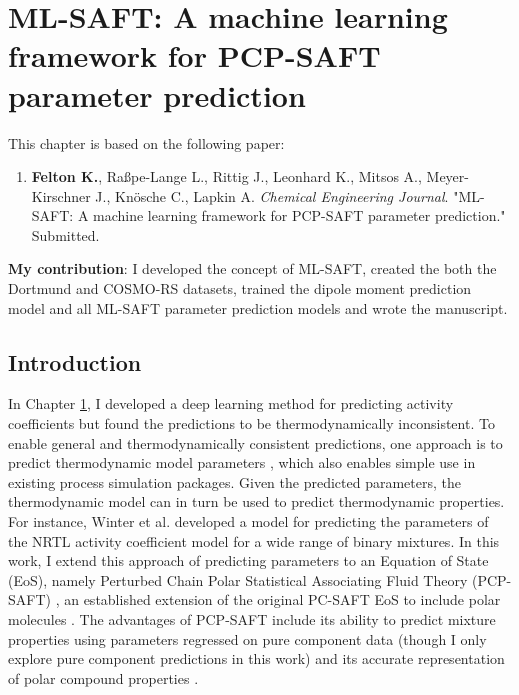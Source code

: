\chapter{ML-SAFT: A machine learning framework for PCP-SAFT parameter prediction}\label{ch:deep_gamma} 
This chapter is based on the following paper:
\begin{enumerate}
\item \textbf{Felton K.}, Ra{\ss}pe-Lange L., Rittig J., Leonhard K., Mitsos A., Meyer-Kirschner J., Kn\"osche C., Lapkin A. \textit{Chemical Engineering Journal}. "ML-SAFT: A machine learning framework for PCP-SAFT parameter prediction." Submitted.
\end{enumerate}
\textbf{My contribution}: I developed the concept of ML-SAFT, created the both the Dortmund and COSMO-RS datasets, trained the dipole moment prediction model and all ML-SAFT parameter prediction models and wrote the manuscript.

\section{Introduction}
\label{sec:intro}
In Chapter \ref{ch:deep_gamma}, I developed a deep learning method for predicting activity coefficients but found the predictions to be thermodynamically inconsistent. To enable general and thermodynamically consistent predictions, one approach is to predict thermodynamic model parameters \cite{Abbasi2020, Matsukawa2021, Madani2021, Abdallahelhadj2022, Winter2022}, which also enables simple use in existing process simulation packages. Given the predicted parameters, the thermodynamic model can in turn be used to predict thermodynamic properties. For instance, Winter et al. \cite{Winter2022} developed a model for predicting the parameters of the NRTL activity coefficient model for a wide range of binary mixtures. In this work, I extend this approach of predicting parameters to an Equation of State (EoS), namely Perturbed Chain Polar Statistical Associating Fluid Theory (PCP-SAFT) \cite{Gross2006}, an established extension of the original PC-SAFT EoS to include polar molecules \cite{Gross2001}. The advantages of PCP-SAFT include its ability to predict mixture properties using parameters regressed on pure component data (though I only explore pure component predictions in this work) and its accurate representation of polar compound properties \cite{Cripwell2017}. 

